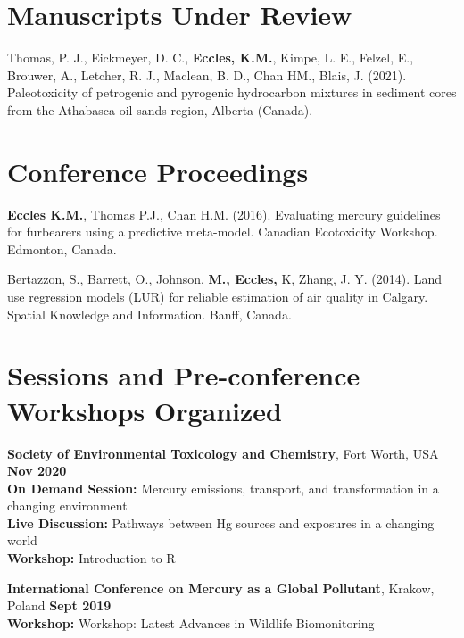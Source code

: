 \documentclass[margin,line]{res}
\begin{document}
\begin{resume}
\vspace*{.1in}

\section{\sc Manuscripts Under Review}

Thomas, P. J., Eickmeyer, D. C., \textbf{Eccles, K.M.}, Kimpe, L. E., Felzel, E., Brouwer, A., Letcher, R. J.,
Maclean, B. D., Chan HM., Blais, J. (2021). Paleotoxicity of petrogenic and pyrogenic hydrocarbon mixtures in sediment cores from the Athabasca oil sands region, Alberta (Canada).

\vspace*{.1in}

\section{\sc Conference Proceedings}
\textbf{Eccles K.M.}, Thomas P.J., Chan H.M. (2016). Evaluating mercury guidelines for furbearers using a predictive meta-model. Canadian Ecotoxicity Workshop. Edmonton, Canada.

Bertazzon, S., Barrett, O., Johnson, \textbf{M., Eccles,} K, Zhang, J. Y. (2014). Land use regression models (LUR) for reliable estimation of air quality in Calgary. Spatial Knowledge and Information. Banff, Canada.\\

\vspace*{.1in}

\section{\sc Sessions and Pre-conference Workshops Organized}
\textbf{Society of Environmental Toxicology and Chemistry}, Fort Worth, USA
\hfill {\bf Nov 2020}\\
\textbf{On Demand Session:} Mercury emissions, transport, and transformation in a changing           environment\\
\textbf{Live Discussion:} Pathways between Hg sources and exposures in a changing world\\
\textbf{Workshop:} Introduction to R

\textbf{International Conference on Mercury as a Global Pollutant}, Krakow, Poland
\hfill {\bf Sept 2019}\\
\textbf{Workshop:} Workshop: Latest Advances in Wildlife Biomonitoring

\vspace*{.1in}


\end{resume}
\end{document}
